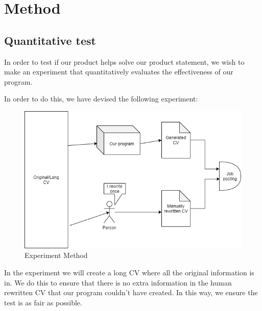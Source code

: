 \section{Method}\label{sec:method}
\subsection{Quantitative test}
In order to test if our product helps solve our product statement, we wish
to make an experiment that quantitatively evaluates the effectiveness of our
program. 

In order to do this, we have devised the following experiment:
\begin{figure}[H]
  \centering
  \includegraphics[scale = 0.6]{figures/experiment1.png}
  \caption{Experiment Method}\label{fig:ie}
\end{figure} 
In the experiment we will create a long CV where all the original information
is in. We do this to ensure that there is no extra information in the human 
rewritten CV that our program couldn't have created. In this way, we ensure
the test is as fair as possible.

